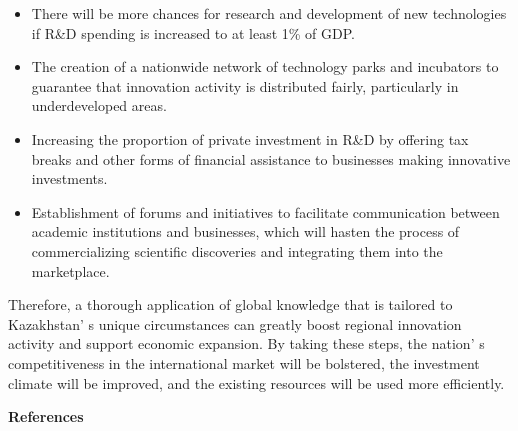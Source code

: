 \begin{multicols}{2}
\begin{itemize}
\item
  There will be more chances for research and development of new
  technologies if R\&D spending is increased to at least 1\% of GDP.
\item
  The creation of a nationwide network of technology parks and
  incubators to guarantee that innovation activity is distributed
  fairly, particularly in underdeveloped areas.
\item
  Increasing the proportion of private investment in R\&D by offering
  tax breaks and other forms of financial assistance to businesses
  making innovative investments.
\item
  Establishment of forums and initiatives to facilitate communication
  between academic institutions and businesses, which will hasten the
  process of commercializing scientific discoveries and integrating them
  into the marketplace.
\end{itemize}

Therefore, a thorough application of global knowledge that is tailored
to Kazakhstan' s unique circumstances can greatly boost
regional innovation activity and support economic expansion. By taking
these steps, the nation' s competitiveness in the
international market will be bolstered, the investment climate will be
improved, and the existing resources will be used more efficiently.
\end{multicols}

\begin{center}
{\bfseries References}
\end{center}

